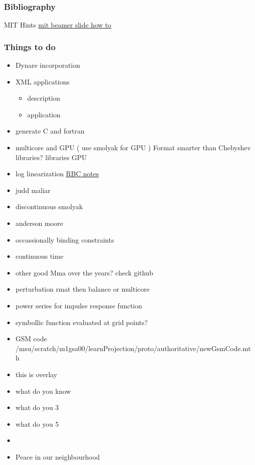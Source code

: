 \documentclass{beamer}
\begin{document}
\begin{frame}
  \frametitle{Bibliography}
  



\end{frame}


\begin{frame}{MIT Hints}
  \href{http://web.mit.edu/rsi/www/pdfs/beamer-tutorial.pdf}{mit beamer slide how to}
\end{frame}
\begin{frame}

  \frametitle{Things to do}
  \begin{itemize}
\item Dynare incorporation
\item XML applications
  \begin{itemize}
  \item description
  \item application
  \end{itemize}
\item generate C and fortran
\item multicore and GPU ( use smolyak for GPU ) Format smarter than Chebyshev libraries?  libraries GPU
\item log linearization 
\href{http://web.mit.edu/14.452/www/pdf/rbc.pdf}{RBC notes}
\item judd maliar
\item discontinuous smolyak
\item anderson moore
\item occassionally binding constraints
\item continuous time
\item other good Mma over the years? check github
\item perturbation  rmat then balance or multicore
\item power series for impulse response function
\item symbollic function evaluated at grid points?
\item GSM code /msu/scratch/m1gsa00/learnProjection/proto/authoritative/newGsmCode.mth
\item<1>{this is overlay}
\item<2>{what do you know}
\item<3>{what do you 3}
\item<5>{what do you 5}
\end{itemize}
 \begin{itemize}
      \item{}
      \item<2-> Peace in our neighbourhood
    \end{itemize}
\end{frame}
\end{document}
